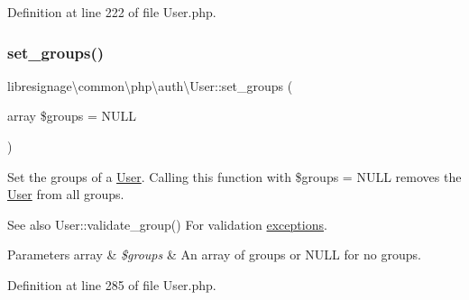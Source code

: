 Definition at line 222 of file User.\+php.

\mbox{\label{classlibresignage_1_1common_1_1php_1_1auth_1_1User_a009ed0d4437ea0b21469f78be4cb8a0d}} 
\subsubsection{\texorpdfstring{set\+\_\+groups()}{set\_groups()}}
{\footnotesize\ttfamily libresignage\textbackslash{}common\textbackslash{}php\textbackslash{}auth\textbackslash{}\+User\+::set\+\_\+groups (\begin{DoxyParamCaption}\item[{array}]{\$groups = {\ttfamily NULL} }\end{DoxyParamCaption})}

Set the groups of a \hyperlink{classlibresignage_1_1common_1_1php_1_1auth_1_1User}{User}. Calling this function with \$groups = N\+U\+LL removes the \hyperlink{classlibresignage_1_1common_1_1php_1_1auth_1_1User}{User} from all groups.

\begin{DoxySeeAlso}{See also}
User\+::validate\+\_\+group() For validation \hyperlink{namespacelibresignage_1_1common_1_1php_1_1auth_1_1exceptions}{exceptions}.
\end{DoxySeeAlso}

\begin{DoxyParams}[1]{Parameters}
array & {\em \$groups} & An array of groups or N\+U\+LL for no groups. \\
\hline
\end{DoxyParams}


Definition at line 285 of file User.\+php.

\mbox{\label{classlibresignage_1_1common_1_1php_1_1auth_1_1User_a59108ef890101d9f9dd34a93d7a7e520}} 
